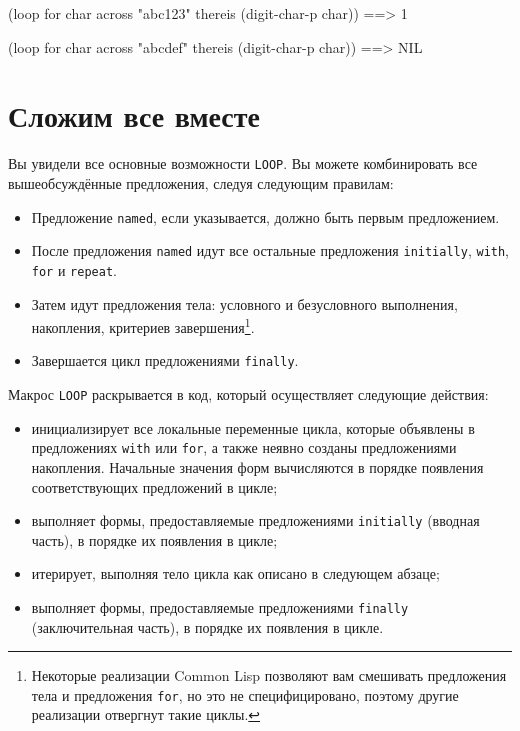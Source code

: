 \begin{myverb}
(loop for char across "abc123" thereis (digit-char-p char)) ==> 1

(loop for char across "abcdef" thereis (digit-char-p char)) ==> NIL
\end{myverb}

\section{Сложим все вместе}

Вы увидели все основные возможности \lstinline{LOOP}. Вы можете комбинировать все вышеобсуждённые
предложения, следуя следующим правилам:

\begin{itemize}
\item Предложение \lstinline{named}, если указывается, должно быть первым предложением.
\item После предложения \lstinline{named} идут все остальные предложения \lstinline{initially},
  \lstinline{with}, \lstinline{for} и \lstinline{repeat}.
\item Затем идут предложения тела: условного и безусловного выполнения, накопления,
  критериев завершения\footnote{Некоторые реализации Common Lisp позволяют вам смешивать
    предложения тела и предложения \lstinline{for}, но это не специфицировано, поэтому другие
    реализации отвергнут такие циклы.}.
\item Завершается цикл предложениями \lstinline{finally}.
\end{itemize}

Макрос \lstinline{LOOP} раскрывается в код, который осуществляет следующие действия:

\begin{itemize}
\item инициализирует все локальные переменные цикла, которые объявлены в предложениях
  \lstinline{with} или \lstinline{for}, а также неявно созданы предложениями накопления. Начальные
  значения форм вычисляются в порядке появления соответствующих предложений в цикле;
\item выполняет формы, предоставляемые предложениями \lstinline{initially} (вводная часть), в
  порядке их появления в цикле;
\item итерирует, выполняя тело цикла как описано в следующем абзаце;
\item выполняет формы, предоставляемые предложениями \lstinline{finally} (заключительная
  часть), в порядке их появления в цикле.
\end{itemize}

